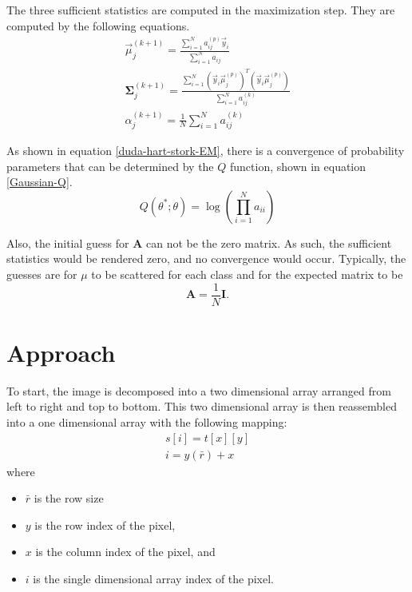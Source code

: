 \documentclass[]{article}
\begin{document}
The three sufficient statistics are computed in the maximization step.   They are computed by the following equations.
\begin{eqnarray}
\vec{\mu} _j ^{(k+1)} = \frac{\sum_{i=1} ^N a_{ij}^{(p)} \vec{y}_i} {\sum_{i=1}^N a_{ij} } \label{yamazaki98introduction_Mu} \\
\mathbf{\Sigma} _j ^{(k+1)} = \frac {\sum_{i=1}^N (\vec{y}_i \vec{\mu}_j ^{(p)} )^T(\vec{y}_i \vec{\mu}_j ^{(p)} ) } {\sum_{i=1}^N a^{(k)}_{ij}} \label{yamazaki98introduction_Sigma} \\
\alpha _j ^ {(k+1)} = \frac{1}{N} \sum_{i=1}^N a^{(k)}_{ij}  \label{yamazaki98introduction_proportions}
\end{eqnarray}


As shown in equation \ref{duda-hart-stork-EM}, there is a convergence of probability parameters that can be determined by the $Q$ function, shown in equation \ref{Gaussian-Q}.  
\begin{equation}
Q ( \theta ^* ; \theta ) =\log (\prod_{i=1} ^N  a_{ii} ) \label{Gaussian-Q}
\end{equation}


Also, the initial guess for $\mathbf{A}$ can not be the zero matrix.  As such, the sufficient statistics would be rendered zero, and no convergence would occur.   Typically, the guesses are for $\mu$ to be scattered for each class and for the expected matrix to be 
\[ 
\mathbf{A} = \frac{1}{N} \mathbf{I}.
\]




\section{Approach} %
\label{sec:approach}

To start, the image is decomposed into a two dimensional array arranged from left to right and top to bottom.   This two dimensional array is then reassembled into a one dimensional array with the following mapping:
\begin{eqnarray}
s[i] = t[x][y] \\
i = y(\bar{r}) + x
\end{eqnarray}
where
\begin{itemize}
	\item $\bar{r}$ is the row size
	\item $y$ is the row index of the pixel, 
	\item $x$ is the column index of the pixel, and 
	\item $i$ is the single dimensional array index of the pixel.
\end{itemize}
\end{document}
